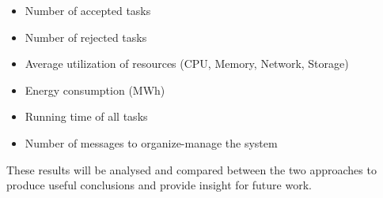 \begin{itemize}
\item Number of accepted tasks
\item Number of rejected tasks
\item Average utilization of resources (CPU, Memory, Network, Storage)
\item Energy consumption (MWh)
\item Running time of all tasks
\item Number of messages to organize-manage the system
\end{itemize}

These results will be analysed and compared between the two approaches to produce useful conclusions and provide insight for future work.
